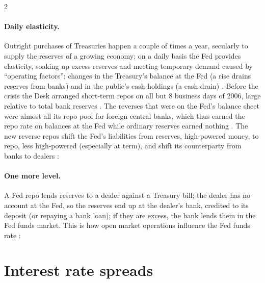 \begin{paracol}{2}
\paragraph{Daily elasticity.} Outright purchases of Treasuries happen a couple of times a year, secularly to supply the reserves of a growing economy; on a daily basis
the Fed provides elasticity, soaking up excess reserves and meeting temporary demand caused by ``operating factors'': changes in the Treasury's balance at the Fed (a rise
drains reserves from banks) and in the public's cash holdings (a cash drain) . Before the crisis the Desk arranged short-term repos on all but 8 business days of
2006, large relative to total bank reserves . The reverses that were on the Fed's balance sheet were almost all its repo pool for foreign central banks,
which thus earned the repo rate on balances at the Fed while ordinary reserves earned nothing . The new reverse repos shift the Fed's liabilities from reserves,
high-powered money, to repo, less high-powered (especially at term), and shift its counterparty from banks to dealers :
\begin{taccts}
\quad
{}\quad
{}
\end{taccts}

\paragraph{One more level.} A Fed repo lends reserves to a dealer against a Treasury bill; the dealer has no account at the Fed, so the reserves end up at the
dealer's bank, credited to its deposit (or repaying a bank loan); if they are excess, the bank lends them in the Fed funds market. This is how open market
operations influence the Fed funds rate :
\begin{taccts}
\quad
{}\quad
{}
\end{taccts}

\section{Interest rate spreads}\label{sec:rp-spreads}


\end{paracol}
